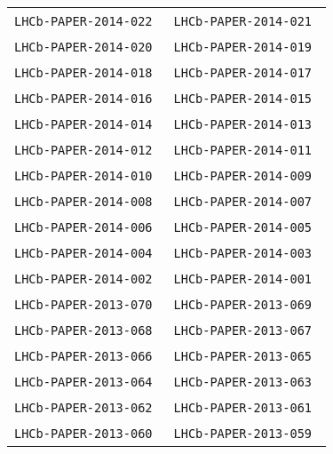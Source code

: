 \begin{center}
\begin{longtable}{ll}
\texttt{LHCb-PAPER-2014-022}~\cite{LHCb-PAPER-2014-022} &
\texttt{LHCb-PAPER-2014-021}~\cite{LHCb-PAPER-2014-021} \\
\texttt{LHCb-PAPER-2014-020}~\cite{LHCb-PAPER-2014-020} &
\texttt{LHCb-PAPER-2014-019}~\cite{LHCb-PAPER-2014-019} \\
\texttt{LHCb-PAPER-2014-018}~\cite{LHCb-PAPER-2014-018} &
\texttt{LHCb-PAPER-2014-017}~\cite{LHCb-PAPER-2014-017} \\
\texttt{LHCb-PAPER-2014-016}~\cite{LHCb-PAPER-2014-016} &
\texttt{LHCb-PAPER-2014-015}~\cite{LHCb-PAPER-2014-015} \\
\texttt{LHCb-PAPER-2014-014}~\cite{LHCb-PAPER-2014-014} &
\texttt{LHCb-PAPER-2014-013}~\cite{LHCb-PAPER-2014-013} \\
\texttt{LHCb-PAPER-2014-012}~\cite{LHCb-PAPER-2014-012} &
\texttt{LHCb-PAPER-2014-011}~\cite{LHCb-PAPER-2014-011} \\
\texttt{LHCb-PAPER-2014-010}~\cite{LHCb-PAPER-2014-010} &
\texttt{LHCb-PAPER-2014-009}~\cite{LHCb-PAPER-2014-009} \\
\texttt{LHCb-PAPER-2014-008}~\cite{LHCb-PAPER-2014-008} &
\texttt{LHCb-PAPER-2014-007}~\cite{LHCb-PAPER-2014-007} \\
\texttt{LHCb-PAPER-2014-006}~\cite{LHCb-PAPER-2014-006} &
\texttt{LHCb-PAPER-2014-005}~\cite{LHCb-PAPER-2014-005} \\
\texttt{LHCb-PAPER-2014-004}~\cite{LHCb-PAPER-2014-004} &
\texttt{LHCb-PAPER-2014-003}~\cite{LHCb-PAPER-2014-003} \\
\texttt{LHCb-PAPER-2014-002}~\cite{LHCb-PAPER-2014-002} &
\texttt{LHCb-PAPER-2014-001}~\cite{LHCb-PAPER-2014-001} \\
\hline
\texttt{LHCb-PAPER-2013-070}~\cite{LHCb-PAPER-2013-070} &
\texttt{LHCb-PAPER-2013-069}~\cite{LHCb-PAPER-2013-069} \\
\texttt{LHCb-PAPER-2013-068}~\cite{LHCb-PAPER-2013-068} &
\texttt{LHCb-PAPER-2013-067}~\cite{LHCb-PAPER-2013-067} \\
\texttt{LHCb-PAPER-2013-066}~\cite{LHCb-PAPER-2013-066} &
\texttt{LHCb-PAPER-2013-065}~\cite{LHCb-PAPER-2013-065} \\
\texttt{LHCb-PAPER-2013-064}~\cite{LHCb-PAPER-2013-064} &
\texttt{LHCb-PAPER-2013-063}~\cite{LHCb-PAPER-2013-063} \\
\texttt{LHCb-PAPER-2013-062}~\cite{LHCb-PAPER-2013-062} &
\texttt{LHCb-PAPER-2013-061}~\cite{LHCb-PAPER-2013-061} \\
\texttt{LHCb-PAPER-2013-060}~\cite{LHCb-PAPER-2013-060} &
\texttt{LHCb-PAPER-2013-059}~\cite{LHCb-PAPER-2013-059} \\

\end{longtable}
\end{center}
